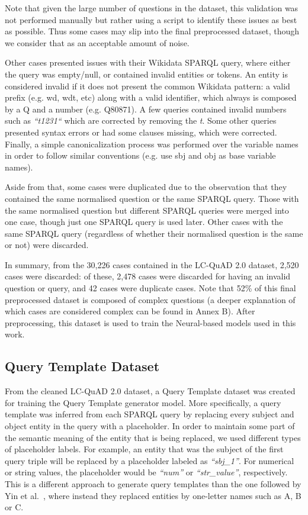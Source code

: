 Note that given the large number of questions in the dataset, this validation was not performed 
manually but rather using a script to identify these issues as best as possible. Thus some cases 
may slip into the final preprocessed dataset, though we consider that as an acceptable amount of 
noise.

Other cases presented issues with their Wikidata SPARQL query, where either the query was 
empty/null, or contained invalid entities or tokens. An entity is considered invalid if it does 
not present the common Wikidata pattern: a valid prefix (e.g. wd, wdt, etc) along with a valid 
identifier, which always is composed by a Q and a number (e.g. Q80871). A few queries contained 
invalid numbers such as \textit{“t1231“} which are corrected by removing the \textit{t}. Some 
other queries presented syntax errors or had some clauses missing, which were corrected. Finally, 
a simple canonicalization process was performed over the variable names in order to follow 
similar conventions (e.g. use sbj and obj as base variable names).

Aside from that, some cases were duplicated due to the observation that they contained the same 
normalised question or the same SPARQL query. Those with the same normalised question but 
different SPARQL queries were merged into one case, though just one SPARQL query is used later. 
Other cases with the same SPARQL query (regardless of whether their normalised question is the 
same or not) were discarded.

In summary, from the 30,226 cases contained in the LC-QuAD 2.0 dataset, 2,520 cases were 
discarded: of these, 2,478 cases were discarded for having an invalid question or query, and 42 
cases were duplicate cases. Note that 52\% of this final preprocessed dataset is composed of 
complex questions (a deeper explanation of which cases are considered complex can be found in 
Annex B). After preprocessing, this dataset is used to train the Neural-based models used in 
this work.

\subsection{Query Template Dataset}
\label{cap4:experimentalDesign/QaDataset/queryTemplate}
From the cleaned LC-QuAD 2.0 dataset, a Query Template dataset was created for training the 
Query Template generator model. More specifically, a query template was inferred from each 
SPARQL query by replacing every subject and object entity in the query with a placeholder. In 
order to maintain some part of the semantic meaning of the entity that is being replaced, we 
used different types of placeholder labels. For example, an entity that was the subject of the 
first query triple will be replaced by a placeholder labeled as \textit{“sbj\_1”}. For numerical 
or string values, the placeholder would be \textit{“num”} or \textit{“str\_value”}, respectively. 
This is a different approach to generate query templates than the one followed by 
Yin et al.~\cite{nmt:nl-to-sparql-Yin19}, where instead they replaced entities by one-letter 
names such as A, B or C. 

